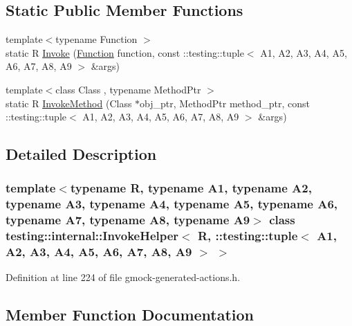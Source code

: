 \subsection*{Static Public Member Functions}
\begin{DoxyCompactItemize}
\item 
{\footnotesize template$<$typename Function $>$ }\\static R \hyperlink{classtesting_1_1internal_1_1InvokeHelper_3_01R_00_01_1_1testing_1_1tuple_3_01A1_00_01A2_00_01A3_1c5f66c8b5e7674a520f1ea38507628c_afd0d2a5a81d947b5b11dc2ede6e49a0e}{Invoke} (\hyperlink{structtesting_1_1internal_1_1Function}{Function} function, const \+::testing\+::tuple$<$ A1, A2, A3, A4, A5, A6, A7, A8, A9 $>$ \&args)
\item 
{\footnotesize template$<$class Class , typename Method\+Ptr $>$ }\\static R \hyperlink{classtesting_1_1internal_1_1InvokeHelper_3_01R_00_01_1_1testing_1_1tuple_3_01A1_00_01A2_00_01A3_1c5f66c8b5e7674a520f1ea38507628c_ab468cf4a3e1ff2fa33a60ce3459c17f7}{Invoke\+Method} (Class $\ast$obj\+\_\+ptr, Method\+Ptr method\+\_\+ptr, const \+::testing\+::tuple$<$ A1, A2, A3, A4, A5, A6, A7, A8, A9 $>$ \&args)
\end{DoxyCompactItemize}


\subsection{Detailed Description}
\subsubsection*{template$<$typename R, typename A1, typename A2, typename A3, typename A4, typename A5, typename A6, typename A7, typename A8, typename A9$>$\newline
class testing\+::internal\+::\+Invoke\+Helper$<$ R, \+::testing\+::tuple$<$ A1, A2, A3, A4, A5, A6, A7, A8, A9 $>$ $>$}



Definition at line 224 of file gmock-\/generated-\/actions.\+h.



\subsection{Member Function Documentation}
\mbox{\label{classtesting_1_1internal_1_1InvokeHelper_3_01R_00_01_1_1testing_1_1tuple_3_01A1_00_01A2_00_01A3_1c5f66c8b5e7674a520f1ea38507628c_afd0d2a5a81d947b5b11dc2ede6e49a0e}} 

